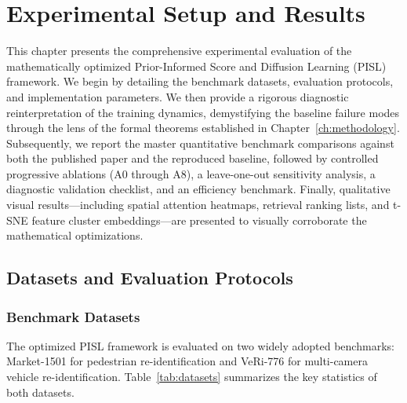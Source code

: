\chapter{Experimental Setup and Results}
\label{ch:experiments}
\label{chap:experiments}

This chapter presents the comprehensive experimental evaluation of the mathematically optimized Prior-Informed Score and Diffusion Learning (PISL) framework. We begin by detailing the benchmark datasets, evaluation protocols, and implementation parameters. We then provide a rigorous diagnostic reinterpretation of the training dynamics, demystifying the baseline failure modes through the lens of the formal theorems established in Chapter~\ref{ch:methodology}. Subsequently, we report the master quantitative benchmark comparisons against both the published paper and the reproduced baseline, followed by controlled progressive ablations (A0 through A8), a leave-one-out sensitivity analysis, a diagnostic validation checklist, and an efficiency benchmark. Finally, qualitative visual results—including spatial attention heatmaps, retrieval ranking lists, and t-SNE feature cluster embeddings—are presented to visually corroborate the mathematical optimizations.

\section{Datasets and Evaluation Protocols}
\label{sec:datasets_protocols}

\subsection{Benchmark Datasets}

The optimized PISL framework is evaluated on two widely adopted benchmarks: Market-1501 for pedestrian re-identification and VeRi-776 for multi-camera vehicle re-identification. Table~\ref{tab:datasets} summarizes the key statistics of both datasets.

